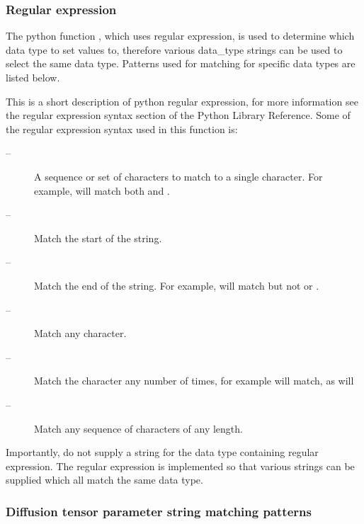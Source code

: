 \subsubsection{Regular expression}

The python function , which uses regular expression, is used to determine which data type to set values to, therefore various data\_type strings can be used to select the same data type.  Patterns used for matching for specific data types are listed below.


This is a short description of python regular expression, for more information see the regular expression syntax section of the Python Library Reference.  Some of the regular expression syntax used in this function is:


\begin{description}
\item[\quotecmd{[]} --]  A sequence or set of characters to match to a single character.  For example,  will match both  and . 
\item[\quotecmd{\^{}} --]  Match the start of the string. 
\item[\quotecmd{\$} --]  Match the end of the string.  For example,  will match  but not  or . 
\item[ --]  Match any character. 
\item[ --]  Match the character  any number of times, for example  will match, as will  
\item[ --]  Match any sequence of characters of any length. 
\end{description}


Importantly, do not supply a string for the data type containing regular expression.  The regular expression is implemented so that various strings can be supplied which all match the same data type.



\subsubsection{Diffusion tensor parameter string matching patterns}


